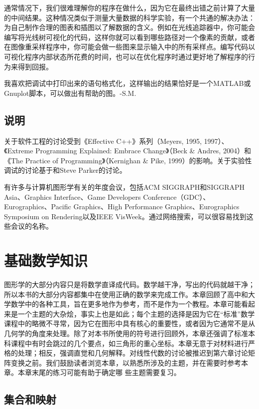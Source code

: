\documentclass[lang=cn,12pt]{elegantbook}
\begin{document}
通常情况下，我们很难理解你的程序在做什么，因为它在最终出错之前计算了大量的中间结果。这种情况类似于测量大量数据的科学实验，有一个共通的解决办法：为自己制作合理的图表和插图以了解数据的含义。例如在光线追踪器中，你可能会编写将光线树可视化的代码，这样你就可以看到哪些路径对一个像素的贡献，或者在图像重采样程序中，你可能会做一些图来显示输入中的所有采样点。编写代码以可视化程序内部状态所花费的时间，也可以在优化程序时通过更好地了解程序的行为来得到回报。

\begin{note}
我喜欢把调试中打印出来的语句格式化，这样输出的结果恰好是一个MATLAB\textsuperscript{\textregistered}或Gnuplot脚本，可以做出有帮助的图。-S.M.
\end{note}

\section*{说明}
关于软件工程的讨论受到《Effective C++》系列（Meyers, 1995, 1997）、《Extreme Programming Explained: Embrace Change》（Beck \& Andres, 2004）和《The Practice of Programming》（Kernighan \& Pike, 1999）的影响。关于实验性调试的讨论基于和Steve Parker的讨论。

有许多与计算机图形学有关的年度会议，包括ACM SIGGRAPH和SIGGRAPH Asia、Graphics Interface、Game Developers Conference（GDC）、Eurographics、Pacific Graphics、High Performance Graphics、Eurographics Symposium on Rendering以及IEEE VisWeek。通过网络搜索，可以很容易找到这些会议的名称。

\chapter{基础数学知识}

图形学的大部分内容只是将数学直译成代码。数学越干净，写出的代码就越干净；所以本书的大部分内容都集中在使用正确的数学来完成工作。本章回顾了高中和大学数学中的各种工具，旨在更多地作为参考，而不是作为一个教程。本章可能看起来是一个主题的大杂烩，事实上也是如此；每个主题的选择是因为它在“标准”数学课程中的略微不寻常，因为它在图形中具有核心的重要性，或者因为它通常不是从几何学的角度来处理。除了对本书所使用的符号进行回顾外，本章还强调了标准本科课程中有时会跳过的几个要点，如三角形的重心坐标。本章无意于对材料进行严格的处理；相反，强调直觉和几何解释。对线性代数的讨论被推迟到第六章讨论矩阵变换之前。我们鼓励读者浏览本章，以熟悉所涉及的主题，并在需要时参考本章。本章末尾的练习可能有助于确定哪 些主题需要复习。

\section{集合和映射}
\end{document}
